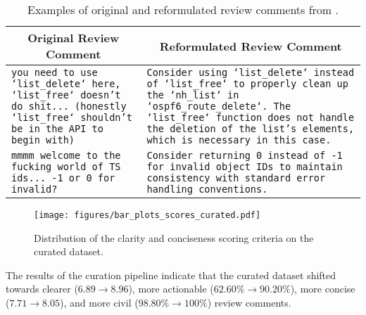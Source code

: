 \begin{table*}[!htbp]
\centering
\caption{Examples of original and reformulated review comments from \oapp.}
\label{tab:reform_examples}
\begin{tabularx}{\textwidth}{XX}
\toprule
\multicolumn{1}{c}{\textbf{Original Review Comment}} & \multicolumn{1}{c}{\textbf{Reformulated Review Comment}} \\
\midrule

\texttt{you need to use `list\_delete` here, `list\_free` doesn't do shit... (honestly `list\_free` shouldn't be in the API to begin with)} &
\texttt{Consider using `list\_delete` instead of `list\_free` to properly clean up the `nh\_list` in `ospf6\_route\_delete`. The `list\_free` function does not handle the deletion of the list's elements, which is necessary in this case.} \\
\midrule


\texttt{mmmm welcome to the fucking world of TS ids... -1 or 0 for invalid?} &
\texttt{Consider returning 0 instead of -1 for invalid object IDs to maintain consistency with standard error handling conventions.} \\
\bottomrule

\end{tabularx}
\vspace{-1em}
\end{table*}




\begin{figure}
    \centering
    \texttt{[image: figures/bar\_plots\_scores\_curated.pdf]}
    \caption{Distribution of the clarity and conciseness scoring criteria on the curated dataset.}
    \label{fig:curated_scoring_dist}
    \vspace{-1.5em}
\end{figure}




\begin{center}
\begin{tcolorbox}[colframe=purple!75!black, colback=purple!5!white, title=\textbf{Answer to RQ2}]
The results of the curation pipeline indicate that the curated dataset shifted towards clearer ($6.89 \rightarrow 8.96$), more actionable ($62.60\% \rightarrow 90.20\%$), more concise ($7.71 \rightarrow 8.05$), and more civil ($98.80\% \rightarrow 100\%$) review comments.
\end{tcolorbox}
\end{center}